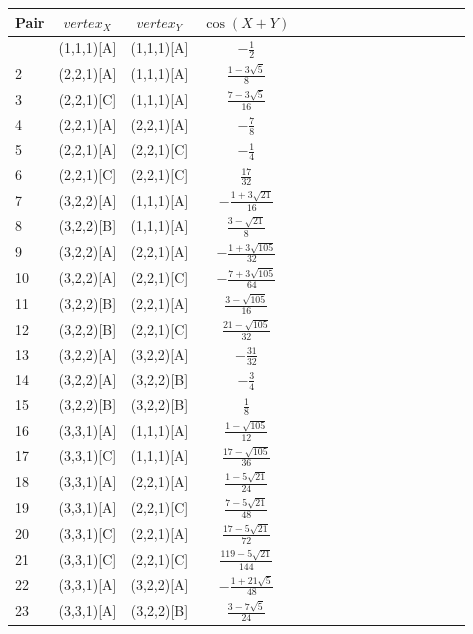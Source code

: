 \documentclass[11pt]{article}
\begin{document}
\begin{longtable}{ | p{1cm}| *{15}{c|} }
\hline
Pair & $vertex_X$ & $vertex_Y$ & $\cos(X+Y)$ \\
\hline\endhead
\hline\endfoot
1 & (1,1,1)[A] & (1,1,1)[A] & $-\frac{1}{2}$\\ %
2 & (2,2,1)[A] & (1,1,1)[A] & $\frac{1-3\sqrt{5}}{8}$\\ %
3 & (2,2,1)[C] & (1,1,1)[A] & $\frac{7-3\sqrt{5}}{16}$\\ %
4 & (2,2,1)[A] & (2,2,1)[A] & $-\frac{7}{8}$\\ %
5 & (2,2,1)[A] & (2,2,1)[C] & $-\frac{1}{4}$\\ %
6 & (2,2,1)[C] & (2,2,1)[C] & $\frac{17}{32}$\\ %
7 & (3,2,2)[A] & (1,1,1)[A] & $-\frac{1+3\sqrt{21}}{16}$\\ %
8 & (3,2,2)[B] & (1,1,1)[A] & $\frac{3-\sqrt{21}}{8}$\\ %
9 & (3,2,2)[A] & (2,2,1)[A] & $-\frac{1+3\sqrt{105}}{32}$\\ %
10 & (3,2,2)[A] & (2,2,1)[C] & $-\frac{7+3\sqrt{105}}{64}$\\ %
11 & (3,2,2)[B] & (2,2,1)[A] & $\frac{3-\sqrt{105}}{16}$\\ %
12 & (3,2,2)[B] & (2,2,1)[C] & $\frac{21-\sqrt{105}}{32}$\\ %
13 & (3,2,2)[A] & (3,2,2)[A] & $-\frac{31}{32}$\\ %
14 & (3,2,2)[A] & (3,2,2)[B] & $-\frac{3}{4}$\\ %
15 & (3,2,2)[B] & (3,2,2)[B] & $\frac{1}{8}$\\ %
16 & (3,3,1)[A] & (1,1,1)[A] & $\frac{1-\sqrt{105}}{12}$\\ %
17 & (3,3,1)[C] & (1,1,1)[A] & $\frac{17-\sqrt{105}}{36}$\\ %
18 & (3,3,1)[A] & (2,2,1)[A] & $\frac{1-5\sqrt{21}}{24}$\\ %
19 & (3,3,1)[A] & (2,2,1)[C] & $\frac{7-5\sqrt{21}}{48}$\\ %
20 & (3,3,1)[C] & (2,2,1)[A] & $\frac{17-5\sqrt{21}}{72}$\\ %
21 & (3,3,1)[C] & (2,2,1)[C] & $\frac{119-5\sqrt{21}}{144}$\\ %
22 & (3,3,1)[A] & (3,2,2)[A] & $-\frac{1+21\sqrt{5}}{48}$\\ %
23 & (3,3,1)[A] & (3,2,2)[B] & $\frac{3-7\sqrt{5}}{24}$\\ %

\end{longtable}
\end{document}
